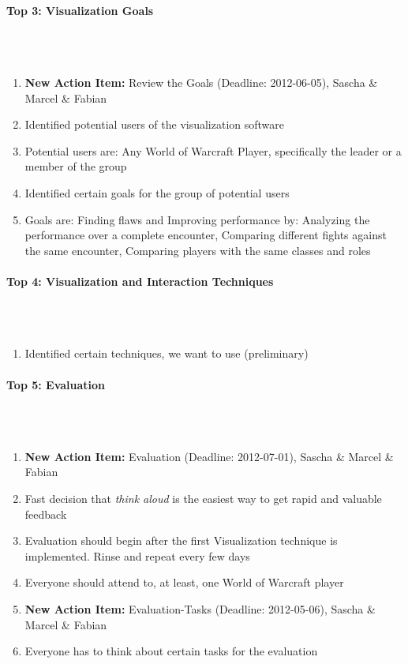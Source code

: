 \documentclass{scrartcl}
\begin{document}
\paragraph{Top 3: Visualization Goals}
\hfill \\ \hfill \\
\begin {enumerate}
\item \textbf{New Action Item:} Review the Goals (Deadline: 2012-06-05), Sascha \& Marcel \& Fabian
\item Identified potential users of the visualization software
\item Potential users are: Any World of Warcraft Player, specifically the leader or a member of the group
\item Identified certain goals for the group of potential users 
\item Goals are: Finding flaws and Improving performance by: Analyzing the performance over a complete encounter, Comparing different fights against the same encounter, Comparing players with the same classes and roles
\end {enumerate}

\paragraph{Top 4: Visualization and Interaction Techniques}
\hfill \\ \hfill \\
\begin {enumerate}
\item Identified certain techniques, we want to use (preliminary)
\end {enumerate}

\paragraph{Top 5: Evaluation}
\hfill \\ \hfill \\
\begin {enumerate}
\item \textbf{New Action Item:} Evaluation (Deadline: 2012-07-01), Sascha \& Marcel \& Fabian
\item Fast decision that \textit{think aloud} is the easiest way to get rapid and valuable feedback
\item Evaluation should begin after the first Visualization technique is implemented. Rinse and repeat every few days
\item Everyone should attend to, at least, one World of Warcraft player
\item \textbf{New Action Item:} Evaluation-Tasks (Deadline: 2012-05-06), Sascha \& Marcel \& Fabian
\item Everyone has to think about certain tasks for the evaluation
\end {enumerate}
\end{document}
